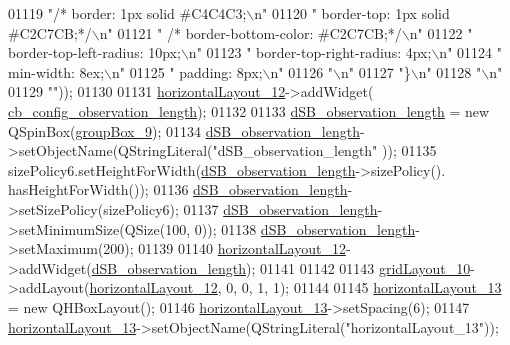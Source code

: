 \begin{DoxyCode}
01119 \textcolor{stringliteral}{"/*     border: 1px solid #C4C4C3;\(\backslash\)n"}
01120 \textcolor{stringliteral}{" border-top: 1px solid #C2C7CB;*/\(\backslash\)n"}
01121 \textcolor{stringliteral}{"   /*  border-bottom-color: #C2C7CB;*/\(\backslash\)n"}
01122 \textcolor{stringliteral}{"     border-top-left-radius: 10px;\(\backslash\)n"}
01123 \textcolor{stringliteral}{"     border-top-right-radius: 4px;\(\backslash\)n"}
01124 \textcolor{stringliteral}{"     min-width: 8ex;\(\backslash\)n"}
01125 \textcolor{stringliteral}{"     padding: 8px;\(\backslash\)n"}
01126 \textcolor{stringliteral}{"\(\backslash\)n"}
01127 \textcolor{stringliteral}{"\}\(\backslash\)n"}
01128 \textcolor{stringliteral}{"\(\backslash\)n"}
01129 \textcolor{stringliteral}{""}));
01130 
01131         \hyperlink{a00027_ad81454913b05646674b1a41c595b8510}{horizontalLayout\_12}->addWidget(
      \hyperlink{a00027_ae9e8f3f0d147a4cd21c8f36ffb3bd81f}{cb\_config\_observation\_length});
01132 
01133         \hyperlink{a00027_a1fe1bf902f2a365c4c94612d2a2ffbcc}{dSB\_observation\_length} = \textcolor{keyword}{new} QSpinBox(\hyperlink{a00027_ab492988d340548c7f30e098419ef10ee}{groupBox\_9});
01134         \hyperlink{a00027_a1fe1bf902f2a365c4c94612d2a2ffbcc}{dSB\_observation\_length}->setObjectName(QStringLiteral(\textcolor{stringliteral}{"dSB\_observation\_length"}
      ));
01135         sizePolicy6.setHeightForWidth(\hyperlink{a00027_a1fe1bf902f2a365c4c94612d2a2ffbcc}{dSB\_observation\_length}->sizePolicy().
      hasHeightForWidth());
01136         \hyperlink{a00027_a1fe1bf902f2a365c4c94612d2a2ffbcc}{dSB\_observation\_length}->setSizePolicy(sizePolicy6);
01137         \hyperlink{a00027_a1fe1bf902f2a365c4c94612d2a2ffbcc}{dSB\_observation\_length}->setMinimumSize(QSize(100, 0));
01138         \hyperlink{a00027_a1fe1bf902f2a365c4c94612d2a2ffbcc}{dSB\_observation\_length}->setMaximum(200);
01139 
01140         \hyperlink{a00027_ad81454913b05646674b1a41c595b8510}{horizontalLayout\_12}->addWidget(\hyperlink{a00027_a1fe1bf902f2a365c4c94612d2a2ffbcc}{dSB\_observation\_length});
01141 
01142 
01143         \hyperlink{a00027_a79b264e6945e3b94a511427b1c270dd7}{gridLayout\_10}->addLayout(\hyperlink{a00027_ad81454913b05646674b1a41c595b8510}{horizontalLayout\_12}, 0, 0, 1, 1);
01144 
01145         \hyperlink{a00027_a3b24c4bb360d79ae2e886fe63c8fdac7}{horizontalLayout\_13} = \textcolor{keyword}{new} QHBoxLayout();
01146         \hyperlink{a00027_a3b24c4bb360d79ae2e886fe63c8fdac7}{horizontalLayout\_13}->setSpacing(6);
01147         \hyperlink{a00027_a3b24c4bb360d79ae2e886fe63c8fdac7}{horizontalLayout\_13}->setObjectName(QStringLiteral(\textcolor{stringliteral}{"horizontalLayout\_13"}));

\end{DoxyCode}
